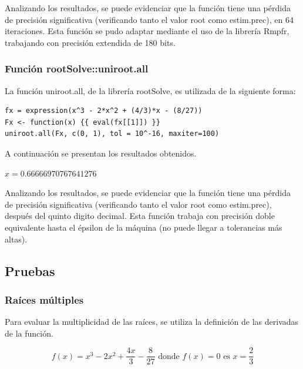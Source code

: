 \documentclass[a4paper,12pt]{article}
\begin{document}
Analizando los resultados, se puede evidenciar que la función tiene una pérdida de precisión significativa (verificando tanto el valor root como estim.prec), en 64 iteraciones. Esta función se pudo adaptar mediante el uso de la librería Rmpfr, trabajando con precisión extendida de 180 bits. \par

\subsubsection{Función rootSolve::uniroot.all}

La función uniroot.all, de la librería rootSolve, es utilizada de la siguiente forma: \par

\begin{verbatim}
fx = expression(x^3 - 2*x^2 + (4/3)*x - (8/27))
Fx <- function(x) {{ eval(fx[[1]]) }}
uniroot.all(Fx, c(0, 1), tol = 10^-16, maxiter=100)
\end{verbatim}

A continuación se presentan los resultados obtenidos. \par

\vspace{1em}
$x=0.66666970767641276$
\vspace{1em}

Analizando los resultados, se puede evidenciar que la función tiene una pérdida de precisión significativa (verificando tanto el valor root como estim.prec), después del quinto digito decimal. Esta función trabaja con precisión doble equivalente hasta el épsilon de la máquina (no puede llegar a tolerancias más altas). \par

\newpage

\subsection{Pruebas}

\subsubsection{Raíces múltiples}

Para evaluar la multiplicidad de las raíces, se utiliza la definición de las derivadas de la función.

\[ f(x)=x^3 -2x^2 + \frac{4x}{3} -\frac{8}{27} \textrm{ donde } f(x)=0 \textrm{ es } x = \frac{2}{3} \]
\end{document}
